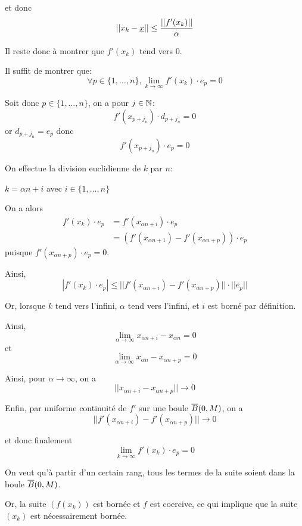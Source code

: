 \documentclass[french,a4paper,10pt]{article}
\begin{document}
\begin{myproof}
		et donc
		\[
			||x_k-\underline{x}||\leq \frac{||f'(x_k)||}{\alpha}
		\]

		Il reste donc à montrer que $f'(x_k)$ tend vers 0.

		Il suffit de montrer que:
		\[
			\forall p\in\{1,\dots,n\}, \lim_{k\to\infty}f'(x_k)\cdot e_p=0
		\]


		Soit donc $p\in\{1,\dots,n\}$, on a pour $j\in\mathbb{N}$:
		\[
			f'(x_{p+j_n})\cdot d_{p+j_n}=0
		\]
		or $d_{p+j_n}=e_p$ donc
		\[
			f'(x_{p+j_n})\cdot e_p=0
		\]

		On effectue la division euclidienne de $k$ par $n$:
		\begin{center}
			$k=\alpha n + i$ avec $i\in\{1,\dots,n\}$
		\end{center}

		On a alors
		\[\begin{aligned}
			f'(x_k)\cdot e_p&=f'(x_{\alpha n + i})\cdot e_p\\
			&=(f'(x_{\alpha n+1})-f'(x_{\alpha n+p}))\cdot e_p
		\end{aligned}\]
		puisque $f'(x_{\alpha n+p})\cdot e_p=0$.

		Ainsi, 
		\[
			|f'(x_k)\cdot e_p|\leq ||f'(x_{\alpha n+i})-f'(x_{\alpha n+p})||\cdot||e_p||
		\]

		Or, lorsque $k$ tend vers l'infini, $\alpha$ tend vers l'infini, et $i$ est borné par définition.

		Ainsi,
		\[
			\lim_{\alpha\to\infty}x_{\alpha n+i}-x_{\alpha n}=0
		\]
		et
		\[
			\lim_{\alpha\to\infty}x_{\alpha n}- x_{\alpha n+p}=0
		\]

		Ainsi, pour $\alpha\to\infty$, on a
		\[
			||x_{\alpha n+i}-x_{\alpha n+p}||\to 0
		\]

		Enfin, par uniforme continuité de $f'$ sur une boule $\overline{B}(0, M)$, on a
		\[
			||f'(x_{\alpha n+i})-f'(x_{\alpha n+p})||\to 0
		\]

		et donc finalement
		\[
			\lim_{k\to\infty}f'(x_k)\cdot e_p=0
		\]

		\begin{oc-remark}
			On veut qu'à partir d'un certain rang, tous les termes
			de la suite soient dans la boule $\overline{B}(0,M)$.

			Or, la suite $(f(x_k))$ est bornée et $f$ est coercive, ce qui
			implique que la suite $(x_k)$ est nécessairement bornée.
		\end{oc-remark}

	\end{myproof}
\end{document}
